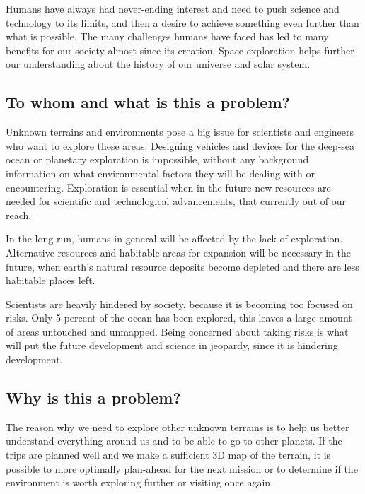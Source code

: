 Humans have always had never-ending interest and need to push science and technology to its limits, and then a desire to achieve something even further than what is possible. The many challenges humans have faced has led to many benefits for our society almost since its creation. Space exploration helps further our understanding about the history of our universe and solar system.\cite{whyweexplo}

\subsection{To whom and what is this a problem?}
Unknown terrains and environments pose a big issue for scientists and engineers who want to explore these areas. Designing vehicles and devices for the deep-sea ocean or planetary exploration is impossible, without any background information on what environmental factors they will be dealing with or encountering. Exploration is essential when in the future new resources are needed for scientific and technological advancements, that currently out of our reach.

In the long run, humans in general will be affected by the lack of exploration. Alternative resources and habitable areas for expansion will be necessary in the future, when earth's natural resource deposits become depleted and there are less habitable places left. 

Scientists are heavily hindered by society, because it is becoming too focused on risks. Only 5 percent of the ocean has been explored, this leaves a large amount of areas untouched and unmapped. Being concerned about taking risks is what will put the future development and science in jeopardy, since it is hindering development.\cite{risksandexplo} 

\subsection{Why is this a problem?}
The reason why we need to explore other unknown terrains is to help us better understand everything around us and to be able to go to other planets. 
If the trips are planned well and we make a sufficient 3D map of the terrain, it is possible to more optimally plan-ahead for the next mission or to determine if the environment is worth exploring further or visiting once again. 

